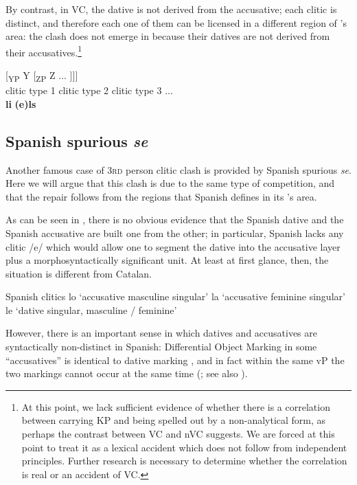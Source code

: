 \documentclass[output=paper,modfonts,nonflat,newtxmath,colorlinks,citecolor=brown]{langsci/langscibook}
\begin{document}
    \z

By contrast, in VC, the dative is not derived from the accusative; each clitic is distinct, and therefore each one of them can be licensed in a different region of \citeauthor{Sportiche1996}’s area: the clash does not emerge in  because their datives are not derived from their accusatives.\footnote{At this point, we lack sufficient evidence of whether there is a correlation between carrying KP and being spelled out by a non-analytical form, as perhaps the contrast between VC and nVC suggests. We are forced at this point to treat it as a lexical accident which does not follow from independent principles. Further research is necessary to determine whether the correlation is real or an accident of VC.}

\ea%
    \label{ex:cabre:17}
    \gll {[\textsubscript{XP} X} { } {[\textsubscript{YP} Y} { } {[\textsubscript{ZP}  Z} ...  ]]]\\
    \footnotesize {clitic type 1} { } \footnotesize {clitic type 2} { }  \footnotesize   {clitic type 3} ...\\
    \glt \textbf{li} \textbf{(e)ls}
	\z

\subsection{Spanish spurious \textit{se}}
\label{sec:cabre:3.2}

An\-\-\-other famous case of \textsc{3rd} person clitic clash is provided by Spanish spurious \textit{se}. Here we will argue that this clash is due to the same type of competition, and that the repair follows from the regions that Spanish defines in its \citeauthor{Sportiche1996}’s area.

As can be seen in , there is no obvious evidence that the Spanish dative and the Spanish accusative are built one from the other; in particular, Spanish lacks any clitic /e/ which would allow one to segment the dative into the accusative layer plus a morphosyntactically significant unit. At least at first glance, then, the situation is different from Catalan.

\ea%
	 Spanish clitics
    \label{ex:cabre:18}
    \ea lo ‘accusative masculine singular’
    \ex la ‘accusative feminine singular’
    \ex le ‘dative singular, masculine / feminine’
    \z
    \z



However, there is an important sense in which datives and accusatives are syntactically non-distinct in Spanish: Differential Object Marking in some ``accusatives'' is identical to dative marking , and in fact within the same vP the two markings cannot occur at the same time  (\citealt{OrmazabalRomero2013Probus}; see also ).
\end{document}
